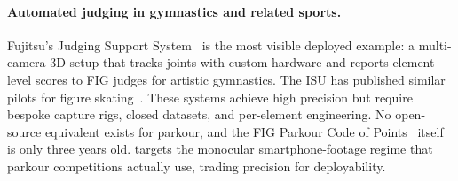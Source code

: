 \paragraph{Automated judging in gymnastics and related sports.}
Fujitsu's Judging Support System~\cite{fujitsu2023jss} is the most visible
deployed example: a multi-camera 3D setup that tracks joints with custom
hardware and reports element-level scores to FIG judges for artistic
gymnastics. The ISU has published similar pilots for figure
skating~\cite{isu2023automation}. These systems achieve high precision but
require bespoke capture rigs, closed datasets, and per-element engineering.
No open-source equivalent exists for parkour, and the FIG Parkour Code of
Points~\cite{fig2025codepoints} itself is only three years old. \sys{} targets
the monocular smartphone-footage regime that parkour competitions actually
use, trading precision for deployability.
